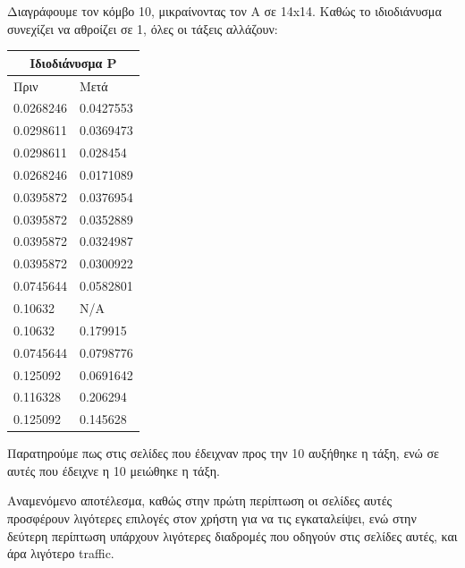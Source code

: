 \documentclass{article}
\newcommand{\lt}{\latintext}
\newcommand{\gt}{\greektext}
\begin{document}
\gt Διαγράφουμε τον κόμβο 10, μικραίνοντας τον Α σε \lt 14x14.
\gt Καθώς το ιδιοδιάνυσμα συνεχίζει να αθροίζει σε 1, όλες οι τάξεις αλλάζουν:\\
\begin{center}
    \begin{tabular}{|p{6cm}|p{6cm}|}
        \hline
        \multicolumn{2}{|c|}{\gt Ιδιοδιάνυσμα \lt P}\\
        \hline
         \gt Πριν &  \gt Μετά\\
        \hline
            0.0268246 & 0.0427553\\
        \hline
            0.0298611 & 0.0369473\\
        \hline
            0.0298611 & 0.028454\\
        \hline
            0.0268246 & 0.0171089\\
        \hline
            0.0395872 & 0.0376954\\
        \hline
            0.0395872 & 0.0352889\\
        \hline
            0.0395872 & 0.0324987\\
        \hline
            0.0395872 & 0.0300922\\
        \hline
            0.0745644 & 0.0582801\\
        \hline
            0.10632 & N/A\\
        \hline
            0.10632 & 0.179915\\
        \hline
            0.0745644 & 0.0798776\\
        \hline
            0.125092 & 0.0691642\\
        \hline
            0.116328 & 0.206294\\
        \hline
            0.125092 & 0.145628\\
        \hline
    \end{tabular}
\end{center}
\newpage

\gt Παρατηρούμε πως στις σελίδες που έδειχναν προς την 10 αυξήθηκε η τάξη,
\gt ενώ σε αυτές που έδειχνε η 10 μειώθηκε η τάξη.

\gt Αναμενόμενο αποτέλεσμα, καθώς στην πρώτη περίπτωση οι σελίδες αυτές προσφέρουν
\gt λιγότερες επιλογές στον χρήστη για να τις εγκαταλείψει, ενώ στην δεύτερη περίπτωση
\gt υπάρχουν λιγότερες διαδρομές που οδηγούν στις σελίδες αυτές, και άρα λιγότερο \lt traffic.

\newpage
\end{document}
